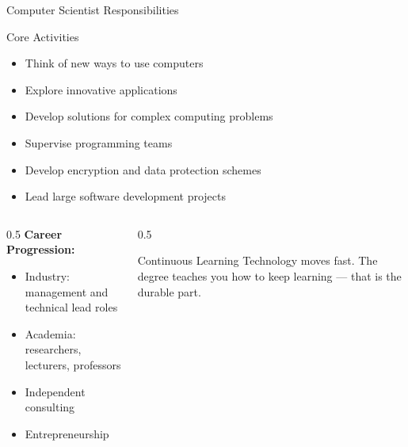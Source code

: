 \documentclass[aspectratio=169]{beamer}
\begin{document}
\begin{frame}{Computer Scientist Responsibilities}
  \begin{block}{Core Activities}
    \begin{itemize}
      \item Think of new ways to use computers
      \item Explore innovative applications
      \item Develop solutions for complex computing problems
      \item Supervise programming teams
      \item Develop encryption and data protection schemes
      \item Lead large software development projects
    \end{itemize}
  \end{block}
  \begin{columns}[T]
    \begin{column}{0.5\textwidth}
      \textbf{Career Progression:}
      \begin{itemize}
        \item Industry: management and technical lead roles
        \item Academia: researchers, lecturers, professors
        \item Independent consulting
        \item Entrepreneurship
      \end{itemize}
    \end{column}
    \begin{column}{0.5\textwidth}
      \begin{alertblock}{Continuous Learning}
        Technology moves fast. The degree teaches you how to keep learning ---
        that is the durable part.
      \end{alertblock}
    \end{column}
  \end{columns}
\end{frame}
\end{document}
